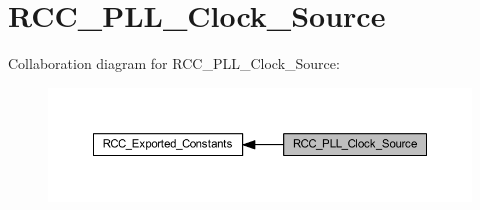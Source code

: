 \hypertarget{group___r_c_c___p_l_l___clock___source}{}\section{R\+C\+C\+\_\+\+P\+L\+L\+\_\+\+Clock\+\_\+\+Source}
\label{group___r_c_c___p_l_l___clock___source}
Collaboration diagram for R\+C\+C\+\_\+\+P\+L\+L\+\_\+\+Clock\+\_\+\+Source\+:
\nopagebreak
\begin{figure}[H]
\begin{center}
\leavevmode
\includegraphics[width=350pt]{group___r_c_c___p_l_l___clock___source}
\end{center}
\end{figure}
